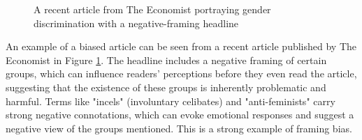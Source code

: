 \begin{figure}[htbp]
    \centering
    \caption{A recent article from The Economist \cite{economist-2024-incels} portraying gender discrimination with a negative-framing headline}
    \label{fig:the-economist-biased-article}
\end{figure}

An example of a biased article can be seen from a recent article published by The Economist \cite{economist-2024-incels} in Figure \ref{fig:the-economist-biased-article}. The headline includes a negative framing of certain groups, which can influence readers' perceptions before they even read the article, suggesting that the existence of these groups is inherently problematic and harmful. Terms like "incels" (involuntary celibates) and "anti-feminists" carry strong negative connotations, which can evoke emotional responses and suggest a negative view of the groups mentioned. This is a strong example of framing bias.

